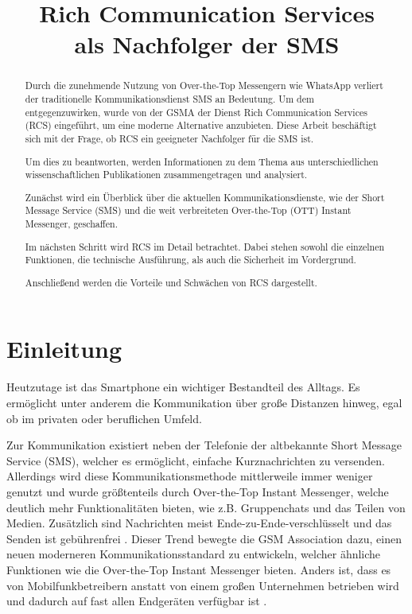 \documentclass[conference]{IEEEtran}
\begin{document}
\title{Rich Communication Services\\als Nachfolger der SMS}

\author{
}

\maketitle

\begin{abstract}
    Durch die zunehmende Nutzung von Over-the-Top Messengern wie WhatsApp verliert der traditionelle Kommunikationsdienst SMS an Bedeutung.
    Um dem entgegenzuwirken, wurde von der GSMA der Dienst Rich Communication Services (RCS) eingeführt, um eine moderne Alternative anzubieten.
    Diese Arbeit beschäftigt sich mit der Frage, ob RCS ein geeigneter Nachfolger für die SMS ist.

    Um dies zu beantworten, werden Informationen zu dem Thema aus unterschiedlichen wissenschaftlichen Publikationen zusammengetragen und analysiert.

    Zunächst wird ein Überblick über die aktuellen Kommunikationsdienste, wie der Short Message Service (SMS) und die weit verbreiteten Over-the-Top (OTT) Instant Messenger, geschaffen.

    Im nächsten Schritt wird RCS im Detail betrachtet.
    Dabei stehen sowohl die einzelnen Funktionen, die technische Ausführung, als auch die Sicherheit im Vordergrund.

    Anschließend werden die Vorteile und Schwächen von RCS dargestellt.
\end{abstract}


\section{Einleitung}
Heutzutage ist das Smartphone ein wichtiger Bestandteil des Alltags.
Es ermöglicht unter anderem die Kommunikation über große Distanzen hinweg, egal ob im privaten oder beruflichen Umfeld.

Zur Kommunikation existiert neben der Telefonie der altbekannte Short Message Service (SMS), welcher es ermöglicht, einfache Kurznachrichten zu versenden.
Allerdings wird diese Kommunikationsmethode mittlerweile immer weniger genutzt und wurde größtenteils durch Over-the-Top Instant Messenger, welche deutlich mehr Funktionalitäten bieten, wie z.B. Gruppenchats und das Teilen von Medien.
Zusätzlich sind Nachrichten meist Ende-zu-Ende-verschlüsselt und das Senden ist gebührenfrei \cite{ottmobinter}.
Dieser Trend bewegte die GSM Association dazu, einen neuen moderneren Kommunikationsstandard zu entwickeln, welcher ähnliche Funktionen wie die Over-the-Top Instant Messenger bieten.
Anders ist, dass es von Mobilfunkbetreibern anstatt von einem großen Unternehmen betrieben wird und dadurch auf fast allen Endgeräten verfügbar ist \cite{uniprof,rcsmno}.
\end{document}
